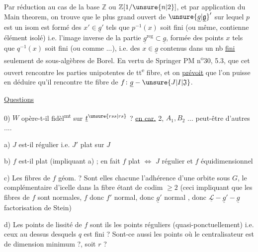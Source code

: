 Par réduction au cas de la base $\mathbb Z$ ou $\mathbb Z[1/\unsure{n|2}]$, et par application du Main theorem, on trouve que le plus grand ouvert de ${\unsure{\underline g|\underline{\mathfrak g}}}'$ sur lequel $p$ est un isom est formé des $x'\in\underline g'$ tels que $p^{-1}(x)$ soit fini (ou même, contienne  élément isolé) i.e. l'image inverse de la partie  $\underline g^{\mathrm{reg}}\subset\underline g$, formée des points $x$ tels que $q^{-1}(x)$ soit fini (ou comme ...), i.e. des $x\in\underline g$ contenus dans un nb \uline{fini} seulement de sous-algèbres de Borel. En vertu de Springer PM n\textsuperscript{o}30, 5.3,  que cet ouvert  rencontre les parties unipotentes de tt\textsuperscript{e} fibre, et on \uline{prévoit} que l'on puisse en déduire qu'il rencontre tte fibre de $f\colon\underline g-\unsure{J|I|\mathfrak J}$.

\uline{Questions}

0) $W$ opère-t-il fidèl\textsuperscript{mt} sur $\underline t^{\unsure{rss|rs}}$ ?  \uline{en car.} 2,  $A_1,B_2$ ... peut-être d'autres ....

a) $J$ est-il régulier i.e. $J'$ plat sur $J$

b) $f$ est-il plat (impliquant a) ; en fait $f$ plat $\Longleftrightarrow$ $J$ régulier et $f$ équidimensionnel


c) Les fibres de $f$ géom.  ? Sont elles chacune l'adhérence d'une orbite sous $G$, le complémentaire d'icelle dans la fibre étant de codim $\geq 2$ (ceci impliquant que les fibres de $f$ sont normales,  $f$ donc $f'$ normal, donc $\underline g'$ normal , donc $\underline{\mathscr L}-\underline g'-\underline g$ factorisation de Stein)
\margin{\unsure{*)}}

d) Les points de lissité de $f$ sont ils les points réguliers (quasi-ponctuellement) i.e. ceux au dessus desquels $q$ est  fini ? Sont-ce aussi les points où le centralisateur  est de dimension minimum ?, soit $r$ ?

